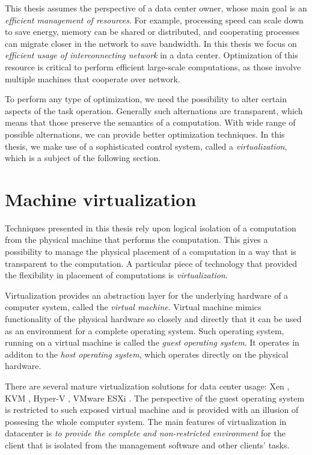 This thesis assumes the perspective of a data center owner, whose main goal is an \emph{efficient management of resources}.
For example, processing speed can scale down to save energy, memory can be shared or distributed, and cooperating processes can migrate closer in the network to save bandwidth.
In this thesis we focus on \emph{efficient usage of interconnecting network} in a data center.
Optimization of this resource is critical to perform efficient large-scale computations, as those involve multiple machines that cooperate over network.

To perform any type of optimization, we need the possibility to alter certain aspects of the task operation.
Generally such alternations are transparent, which means that those preserve the semantics of a computation.
With wide range of possible alternations, we can provide better optimization techniques.
In this thesis, we make use of a sophisticated control system, called a \emph{virtualization}, which is a subject of the following section.

\section{Machine virtualization}

Techniques presented in this thesis rely upon logical isolation of a computation from the physical machine that performs the computation.
This gives a possibility to manage the physical placement of a computation in a way that is transparent to the computation.
A particular piece of technology that provided the flexibility in placement of computations is \emph{virtualization}.

Virtualization provides an abstraction layer for the underlying hardware of a computer system, called the \emph{virtual machine}.
Virtual machine mimics functionality of the physical hardware so closely and
directly that it can be used as an environment for a complete operating system.
Such operating system, running on a virtual machine is called the \emph{guest
operating system}. It operates in additon to the \emph{host operating
system}, which operates directly on the physical hardware. 

There are several mature virtualization solutions for data center usage: Xen
\cite{url-xen}, KVM \cite{url-kvm}, Hyper-V \cite{url-hyperv}, VMware ESXi
\cite{url-vmware}. The perspective of the guest
operating system is restricted to such exposed virtual machine and is provided
with an illusion of possesing the whole computer system. The main features of
virtualization in datacenter is \emph{to provide the complete and
non-restricted environment} for the client that is isolated from the management
software and other clients' tasks.

